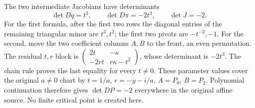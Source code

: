 The two intermediate Jacobians have determinants
\[
 \det Dq=t^3,\qquad \det D\pi=-2t^3,\qquad \det J=-2.
 \tag{FD8}
\]
For the first formula, after the first two rows the diagonal
entries of the remaining triangular minor are \(t^3,t^2\);
the first two pivots are \(-t^{-2},-1\). For the second,
move the two coefficient columns \(A,B\) to the front, an
even permutation. The residual \(t,r\) block is
\(\left(\begin{smallmatrix}2t&-\kappa\\-2rt&r\kappa-t^2\end{smallmatrix}\right)\),
whose determinant is \(-2t^3\). The chain rule proves the
last equality for every \(t\ne0\). These parameter values
cover the original \(a\ne0\) chart by \(t=1/a\),
\(r=-y-i/a\), \(A=P_0\), \(B=P_2\). Polynomial continuation
therefore gives \(\det DP=-2\) everywhere in the original
affine source. No finite critical point is created here.

